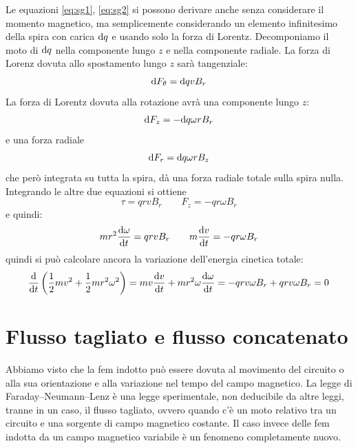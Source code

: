 \begin{Es}
  Le equazioni \eqref{eq:sg1}, \eqref{eq:sg2} si possono derivare anche senza considerare il momento magnetico, ma semplicemente considerando un elemento infinitesimo della spira con carica $\mathrm{d} q$ e usando solo la forza di Lorentz. Decomponiamo il moto di $\mathrm{d} q$ nella componente lungo $z$ e nella componente radiale. La forza di Lorenz dovuta allo spostamento lungo $z$ sarà tangenziale:
  \begin{equation}
    \mathrm{d} F_\theta = \mathrm{d} q v B_r
  \end{equation}
  La forza di Lorentz dovuta alla rotazione avrà una componente lungo $z$:
  \begin{equation}
    \mathrm{d} F_z = -\mathrm{d} q \omega r B_r
  \end{equation}
  e una forza radiale
  \begin{equation}
    \mathrm{d} F_r = \mathrm{d} q \omega r B_z
  \end{equation}
  che però integrata su tutta la spira, dà una forza radiale totale sulla spira nulla. Integrando le altre due equazioni si ottiene
  \begin{equation}
    \tau = q rv B_r \qquad F_z = -q r \omega B_r
  \end{equation}
  e quindi:
  \begin{equation}
    mr^2\frac{\mathrm{d}\omega}{\mathrm{d} t} = q rv B_r\qquad m\frac{\mathrm{d} v}{\mathrm{d} t} = -q r \omega B_r
  \end{equation}
  quindi si può calcolare ancora la variazione dell'energia cinetica totale:
  \begin{equation}
    \frac{\mathrm{d}}{\mathrm{d} t}\left(\frac{1}{2}mv^2+\frac{1}{2}mr^2\omega^2\right) = mv\frac{\mathrm{d} v}{\mathrm{d} t} + mr^2\omega\frac{\mathrm{d}\omega}{\mathrm{d} t} = -q rv \omega B_r+q rv\omega B_r = 0
  \end{equation}
\end{Es}

\section{Flusso tagliato e flusso concatenato}
Abbiamo visto che la fem indotto può essere dovuta al movimento del circuito o alla sua orientazione e alla variazione nel tempo del campo magnetico. La legge di Faraday--Neumann--Lenz è una legge sperimentale, non deducibile da altre leggi, tranne in un caso, il flusso tagliato, ovvero quando c'è un moto relativo tra un circuito e una sorgente di campo magnetico costante. Il caso invece delle fem indotta da un campo magnetico variabile è un fenomeno completamente nuovo.

